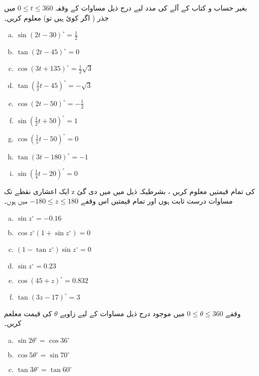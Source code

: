  بغیر حساب و کتاب کے آلے کی مدد لیے درج ذیل مساوات کے  وقفہ
\( 0 \leqslant t\leqslant360 \) 
میں جذر ( اگر کوئ ہیں تو) معلوم کریں۔
\begin{multicols}{3}
\begin{enumerate}[a.]
\item \(\sin \left(2t-30\right)^{\circ}=\frac{1}{2} \) 
\item \( \tan\left(2t-45\right)^{\circ}= 0 \) 
\item \( \cos\left(3t+135\right)^{\circ}=\frac{1}{2}\sqrt{3} \) 
\item \( \tan\left(\frac{3}{2}t-45\right)^{\circ}=-\sqrt{3} \) 
\item \( \cos \left(2t-50\right)^{\circ}=-\frac{1}{2}  \) 
\item \( \sin\left(\frac{1}{2}t+50\right)^{\circ}=1 \) 
\item \( \cos\left(\frac{1}{5}t-50\right)^{\circ}=0 \) 
\item \( \tan \left(3t-180\right)^{\circ}=-1 \) 
\item \( \sin\left(\frac{1}{4}t-20\right)^{\circ}=0 \) 
\end{enumerate}
\end{multicols}

ایک اعشاری نقطے تک    z    کی تمام قیمتیں معلوم کریں ، بشرطیکہ ذیل میں میں دی گئ مساوات درست ثابت ہوں اور تمام قیمتیں اس وقفے \( -180 \leqslant z \leqslant 180 \) میں ہوں۔


\begin{multicols}{3}
\begin{enumerate}[a.]
\item \( \sin z^{\circ}=-0.16 \) 
\item \( \cos z^{\circ}\left(1+\sin z^{\circ}\right)=0 \) 
\item \( \left(1-\tan z^{\circ}\right)\sin z^{\circ} = 0 \) 
\item \( \sin z^{\circ}=0.23 \) 
\item \( \cos\left(45+z\right)^{\circ}=0.832 \) 
\item \( \tan\left(3z-17\right)^{\circ}=3 \) 
\end{enumerate}
\end{multicols}

 
  وقفے   \( 0 \leq \theta \leq 360 \) میں موجود درج ذیل مساوات کے لیے زاویے \( \theta \) 	کی قیمت معلعم کریں۔%


\begin{multicols}{3}
\begin{enumerate}[a.]
\item \( \sin 2\theta^{\circ}=\cos 36^{\circ} \) 
\item \( \cos 5\theta^{\circ}=\sin 70^{\circ} \) 
\item \( \tan 3\theta^{\circ}=\tan 60^{\circ} \) 
\end{enumerate}
\end{multicols}


